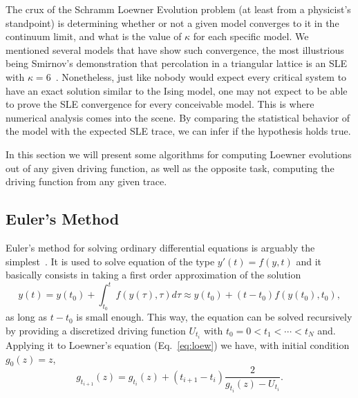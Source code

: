 The crux of the Schramm Loewner Evolution problem (at least from a physicist's
standpoint) is determining whether or not a given model converges to it in the
continuum limit, and what is the value of $\kappa$ for each specific model. We
mentioned several models that have show such convergence, the most illustrious
being Smirnov's demonstration that percolation in a triangular lattice is an
SLE with $\kappa=6$~\cite{Smirnov2001b}. Nonetheless, just like nobody would
expect every critical system to have an exact solution similar to the Ising
model, one may not expect to be able to prove the SLE convergence for every
conceivable model. This is where numerical analysis comes into the scene. By
comparing the statistical behavior of the model with the expected SLE trace, we
can infer if the hypothesis holds true.

In this section we will present some algorithms for computing Loewner
evolutions out of any given driving function, as well as the opposite task,
computing the driving function from any given trace.


\subsection{Euler's Method}
\label{ss:euler}

Euler's method for solving ordinary differential equations is arguably the
simplest~\cite{Press2007}. It is used to solve equation of the type $y'(t) =
f(y, t)$ and it basically consists in taking a first order approximation of the
solution
\begin{equation}
    \newcommand{\y}[1]{y\left(#1\right)}
    \newcommand{\f}[1]{f\left(#1\right)}
    \y{t} = \y{t_0} + \int_{t_0}^t \f{\y{\tau}, \tau} d\tau \approx
            \y{t_0} + \left(t - t_0\right)\f{\y{t_0}, t_0},
\end{equation}
as long as $t - t_0$ is small enough. This way, the equation can be solved
recursively by providing a discretized driving function $U_{t_i}$ with $t_0 =
0 < t_{1}<\cdots<t_N$ and. Applying it to Loewner's equation
(Eq.~\ref{eq:loew}) we have, with initial condition $g_0(z)=z$,
\begin{equation}
    g_{t_{i+1}}(z) = g_{t_i}(z) + (t_{i+1} - t_i) \frac{2}{g_{t_i}(z) - U_{t_i}}.
\end{equation}


